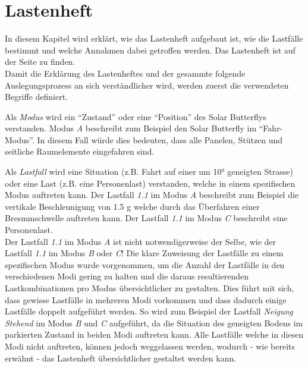 \section{Lastenheft}
\label{Lastenheft}
In diesem Kapitel wird erklärt, wie das Lastenheft aufgebaut ist, wie die Lastfälle bestimmt und welche Annahmen dabei getroffen werden. Das Lastenheft ist auf der Seite \pageref{Lastenheft A} zu finden.\\

Damit die Erklärung des Lastenheftes und der gesammte folgende Auslegungsprozess an sich verständlicher wird, werden zuerst die verwendeten Begriffe definiert.

Als \emph{Modus} wird ein ``Zustand'' oder eine ``Position'' des Solar Butterflys verstanden. Modus \emph{A} beschreibt zum Beispiel den Solar Butterfly im ``Fahr-Modus''. In diesem Fall würde dies bedeuten, dass alle Panelen, Stützen und seitliche Raumelemente eingefahren sind.

Als \emph{Lastfall} wird eine Situation (z.B. Fahrt auf einer um 10° geneigten Strasse) oder eine Last (z.B. eine Personenlast) verstanden, welche in einem spezifischen Modus auftreten kann. Der Lastfall \emph{1.1} im Modus \emph{A} beschreibt zum Beispiel die vertikale Beschleunigung von 1.5 g welche durch das Überfahren einer Bresmmschwelle auftreten kann. Der Lastfall \emph{1.1} im Modus \emph{C} beschreibt eine Personenlast.\\
Der Lastfall \emph{1.1} im Modus \emph{A} ist nicht notwendigerweise der Selbe, wie der Lastfall \emph{1.1} im Modus \emph{B} oder \emph{C}! Die klare Zuweisung der Lastfälle zu einem spezifischen Modus wurde vorgenommen, um die Anzahl der Lastfälle in den verschiedenen Modi gering zu halten und die daraus resultierenden Lastkombinationen pro Modus übersichtlicher zu gestalten. Dies führt mit sich, dass gewisse Lastfälle in mehreren Modi vorkommen und dass dadurch einige Lastfälle doppelt aufgeführt werden. So wird zum Beispiel der Lastfall \emph{Neigung Stehend} im Modus \emph{B} und \emph{C} aufgeführt, da die Situation des geneigten Bodens im parkierten Zustand in beiden Modi auftreten kann. Alle Lastfälle welche in diesen Modi nicht auftreten, können jedoch weggelassen werden, wodurch - wie bereits erwähnt - das Lastenheft übersichtlicher gestaltet werden kann.

